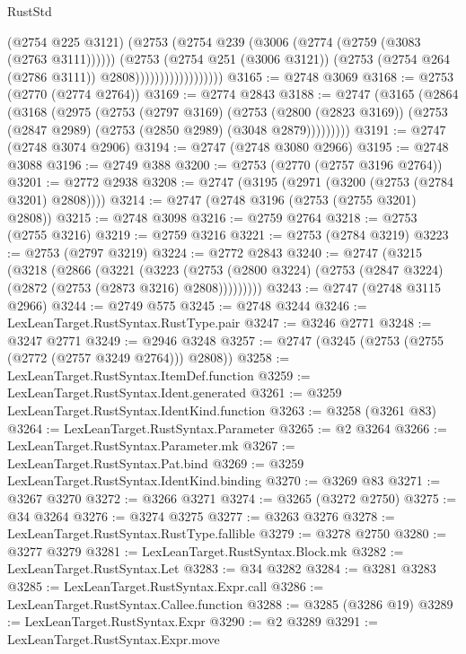 \begin{lexlean}{RustStd}
\begin{coremodule}
                                  (@2754 @225 @3121)
                                  (@2753
                                    (@2754 @239 (@3006 (@2774 (@2759 (@3083 (@2763 @3111))))))
                                    (@2753
                                      (@2754 @251 (@3006 @3121))
                                      (@2753 (@2754 @264 (@2786 @3111)) @2808))))))))))))))))))
@3165 := @2748 @3069
@3168 := @2753 (@2770 (@2774 @2764))
@3169 := @2774 @2843
@3188 := @2747
    (@3165
      (@2864
        (@3168
          (@2975
            (@2753
              (@2797 @3169)
              (@2753
                (@2800 (@2823 @3169))
                (@2753 (@2847 @2989) (@2753 (@2850 @2989) (@3048 @2879)))))))))
@3191 := @2747 (@2748 @3074 @2906)
@3194 := @2747 (@2748 @3080 @2966)
@3195 := @2748 @3088
@3196 := @2749 @388
@3200 := @2753 (@2770 (@2757 @3196 @2764))
@3201 := @2772 @2938
@3208 := @2747 (@3195 (@2971 (@3200 (@2753 (@2784 @3201) @2808))))
@3214 := @2747 (@2748 @3196 (@2753 (@2755 @3201) @2808))
@3215 := @2748 @3098
@3216 := @2759 @2764
@3218 := @2753 (@2755 @3216)
@3219 := @2759 @3216
@3221 := @2753 (@2784 @3219)
@3223 := @2753 (@2797 @3219)
@3224 := @2772 @2843
@3240 := @2747
    (@3215
      (@3218
        (@2866
          (@3221
            (@3223
              (@2753 (@2800 @3224) (@2753 (@2847 @3224) (@2872 (@2753 (@2873 @3216) @2808)))))))))
@3243 := @2747 (@2748 @3115 @2966)
@3244 := @2749 @575
@3245 := @2748 @3244
@3246 := LexLeanTarget.RustSyntax.RustType.pair
@3247 := @3246 @2771
@3248 := @3247 @2771
@3249 := @2946 @3248
@3257 := @2747 (@3245 (@2753 (@2755 (@2772 (@2757 @3249 @2764))) @2808))
@3258 := LexLeanTarget.RustSyntax.ItemDef.function
@3259 := LexLeanTarget.RustSyntax.Ident.generated
@3261 := @3259 LexLeanTarget.RustSyntax.IdentKind.function
@3263 := @3258 (@3261 @83)
@3264 := LexLeanTarget.RustSyntax.Parameter
@3265 := @2 @3264
@3266 := LexLeanTarget.RustSyntax.Parameter.mk
@3267 := LexLeanTarget.RustSyntax.Pat.bind
@3269 := @3259 LexLeanTarget.RustSyntax.IdentKind.binding
@3270 := @3269 @83
@3271 := @3267 @3270
@3272 := @3266 @3271
@3274 := @3265 (@3272 @2750)
@3275 := @34 @3264
@3276 := @3274 @3275
@3277 := @3263 @3276
@3278 := LexLeanTarget.RustSyntax.RustType.fallible
@3279 := @3278 @2750
@3280 := @3277 @3279
@3281 := LexLeanTarget.RustSyntax.Block.mk
@3282 := LexLeanTarget.RustSyntax.Let
@3283 := @34 @3282
@3284 := @3281 @3283
@3285 := LexLeanTarget.RustSyntax.Expr.call
@3286 := LexLeanTarget.RustSyntax.Callee.function
@3288 := @3285 (@3286 @19)
@3289 := LexLeanTarget.RustSyntax.Expr
@3290 := @2 @3289
@3291 := LexLeanTarget.RustSyntax.Expr.move

\end{coremodule}
\end{lexlean}
